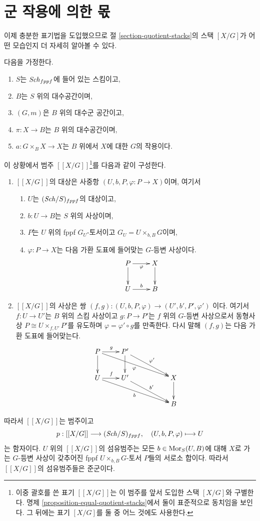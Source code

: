 \section{군 작용에 의한 몫}
\label{section-group-quotient-stacks}

\noindent
이제 충분한 표기법을 도입했으므로 절 \ref{section-quotient-stacks}의 스택
$[X/G]$가 어떤 모습인지 더 자세히 알아볼 수 있다.

\begin{situation}
\label{situation-quotient-stack}
다음을 가정한다.
\begin{enumerate}
\item $S$는 $\mathit{Sch}_{fppf}$에 들어 있는 스킴이고,
\item $B$는 $S$ 위의 대수공간이며,
\item $(G, m)$은 $B$ 위의 대수군 공간이고,
\item $\pi : X \to B$는 $B$ 위의 대수공간이며,
\item $a : G \times_B X \to X$는 $B$ 위에서 $X$에 대한 $G$의 작용이다.
\end{enumerate}
\end{situation}

\noindent
이 상황에서 범주 $[[X/G]]$\footnote{이중 괄호를 쓴 표기 $[[X/G]]$는 이
범주를 앞서 도입한 스택 $[X/G]$와 구별한다. 명제
\ref{proposition-equal-quotient-stacks}에서 둘이 표준적으로 동치임을 보인다.
그 뒤에는 표기 $[X/G]$를 둘 중 어느 것에도 사용한다.}를 다음과 같이
구성한다.
\begin{enumerate}
\item $[[X/G]]$의 대상은 사중항 $(U, b, P, \varphi : P \to X)$이며, 여기서
\begin{enumerate}
\item $U$는 $(\mathit{Sch}/S)_{fppf}$의 대상이고,
\item $b : U \to B$는 $S$ 위의 사상이며,
\item $P$는 $U$ 위의 fppf $G_U$-토서이고 $G_U = U \times_{b, B} G$이며,
\item $\varphi : P \to X$는 다음 가환 도표에 들어맞는 $G$-등변 사상이다.
$$
\xymatrix{
P \ar[d] \ar[r]_{\varphi} & X \ar[d] \\
U \ar[r]^b & B
}
$$
\end{enumerate}
\item $[[X/G]]$의 사상은 쌍
$(f, g) : (U, b, P, \varphi) \to (U', b', P', \varphi')$
이다. 여기서 $f : U \to U'$는 $B$ 위의 스킴 사상이고 $g : P \to P'$는
$f$ 위의 $G$-등변 사상으로서 동형사상 $P \cong U \times_{f, U'} P'$를
유도하며 $\varphi = \varphi' \circ g$를 만족한다. 다시 말해 $(f, g)$는
다음 가환 도표에 들어맞는다.
$$
\xymatrix{
P \ar[d] \ar[rrrd]_\varphi \ar[r]^g & P' \ar[d] \ar[rrd]^{\varphi'} \\
U \ar[rrrd]_b \ar[r]^f & U' \ar[rrd]^{b'} & & X \ar[d] \\
& & & B
}
$$
\end{enumerate}
따라서 $[[X/G]]$는 범주이고
$$
p : [[X/G]] \longrightarrow (\mathit{Sch}/S)_{fppf},
\quad
(U, b, P, \varphi) \longmapsto U
$$
는 함자이다. $U$ 위의 $[[X/G]]$의 섬유범주는 모든
$b \in \mathop{\mathrm{Mor}}\nolimits_S(U, B)$에 대해 $X$로 가는 $G$-등변 사상이 갖추어진 fppf
$U \times_{b, B} G$-토서 $P$들의 서로소 합이다. 따라서 $[[X/G]]$의
섬유범주들은 준군이다.

